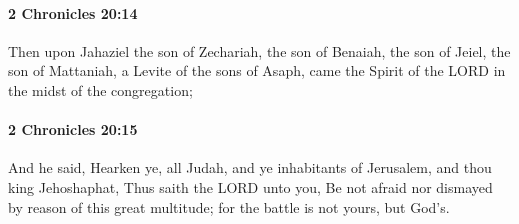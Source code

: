 		\paragraph{2 Chronicles 20:14} %
			\label{2CHRONICLES-20-14}

			Then upon Jahaziel the son of Zechariah, the son of Benaiah, the son of Jeiel, the son of Mattaniah, a Levite of the sons of Asaph, came the Spirit of the LORD in the midst of the congregation;


		\paragraph{2 Chronicles 20:15} %
			\label{2CHRONICLES-20-15}

			And he said, Hearken ye, all Judah, and ye inhabitants of Jerusalem, and thou king Jehoshaphat, Thus saith the LORD unto you, Be not afraid nor dismayed by reason of this great multitude; for the battle is not yours, but God's.

